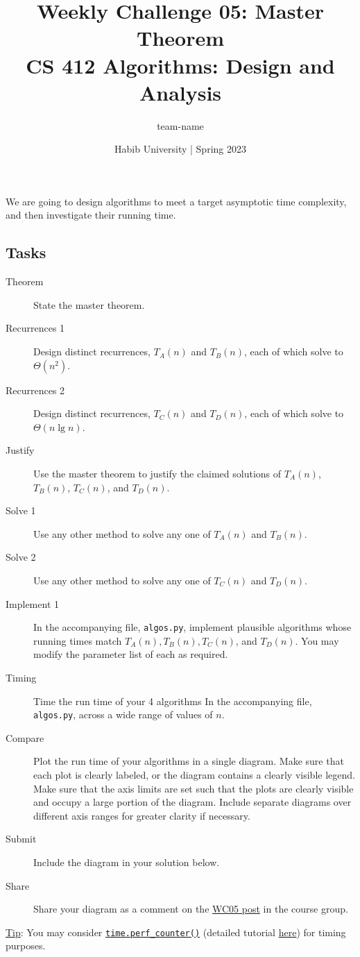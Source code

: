 \documentclass[a4paper]{exam}
\title{Weekly Challenge 05: Master Theorem\\CS 412 Algorithms: Design and Analysis}
\author{team-name}  %
\date{Habib University | Spring 2023}
\begin{document}
\maketitle

\begin{questions}

  

  We are going to design algorithms to meet a target asymptotic time complexity, and then investigate their running time.

  \subsection*{Tasks}
  \begin{description}
  \item[Theorem] State the master theorem.
  \item[Recurrences 1] Design distinct recurrences, $T_A(n)$ and $T_B(n)$, each of which solve to $\Theta(n^2)$.
  \item[Recurrences 2] Design distinct recurrences, $T_C(n)$ and $T_D(n)$, each of which solve to $\Theta(n\lg n)$.
  \item[Justify] Use the master theorem to justify the claimed solutions of  $T_A(n)$, $T_B(n)$, $T_C(n)$, and $T_D(n)$.
  \item[Solve 1] Use any other method to solve any one of  $T_A(n)$ and $T_B(n)$.
  \item[Solve 2] Use any other method to solve any one of  $T_C(n)$ and $T_D(n)$.
  \item[Implement 1] In the accompanying file, \texttt{algos.py}, implement plausible algorithms whose running times match $T_A(n),T_B(n), T_C(n)$, and $T_D(n)$. You may modify the parameter list of each as required.
  \item[Timing] Time the run time of your 4 algorithms In the accompanying file, \texttt{algos.py}, across a wide range of values of $n$.
  \item[Compare] Plot the run time of your algorithms in a single diagram. Make sure that each plot is clearly labeled, or the diagram contains a clearly visible legend. Make sure that the axis limits are set such that the plots are clearly visible and occupy a large portion of the diagram. Include separate diagrams over different axis ranges for greater clarity if necessary.
  \item[Submit] Include the diagram in your solution below.
  \item[Share] Share your diagram as a comment on the \href{https://web.yammer.com/main/org/habib.edu.pk/threads/eyJfdHlwZSI6IlRocmVhZCIsImlkIjoiMjEyMzI4NzkzMzY4MTY2NCJ9}{WC05 post} in the course group.
  \end{description}
  \underline{Tip}: You may consider \href{https://stackoverflow.com/a/68054319/1382487}{\texttt{time.perf\_counter()}} (detailed tutorial \href{https://realpython.com/python-timer/#other-python-timer-functions}{here}) for timing purposes.
  
  \begin{solution}
  \end{solution}

\end{questions}
\end{document}

